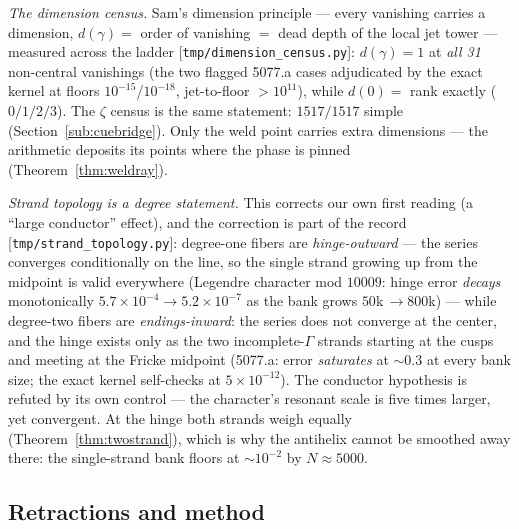 \documentclass[11pt]{article}
\newcommand{\code}[1]{\texttt{#1}}
\begin{document}
\emph{The dimension census.}  Sam's dimension principle --- every vanishing carries a dimension,
$d(\gamma)=$ order of vanishing $=$ dead depth of the local jet tower --- measured across the
ladder [\code{tmp/dimension\_census.py}]: $d(\gamma)=1$ at \emph{all 31} non-central vanishings
(the two flagged 5077.a cases adjudicated by the exact kernel at floors
$10^{-15}$/$10^{-18}$, jet-to-floor $>10^{11}$), while $d(0)=$ rank exactly ($0/1/2/3$).  The
$\zeta$ census is the same statement: $1517/1517$ simple (Section~\ref{sub:cuebridge}).  Only the
weld point carries extra dimensions --- the arithmetic deposits its points where the phase is
pinned (Theorem~\ref{thm:weldray}).

\emph{Strand topology is a degree statement.}  This corrects our own first reading (a ``large
conductor'' effect), and the correction is part of the record [\code{tmp/strand\_topology.py}]:
degree-one fibers are \emph{hinge-outward} --- the series converges conditionally on the line, so
the single strand growing up from the midpoint is valid everywhere (Legendre character mod
$10009$: hinge error \emph{decays} monotonically $5.7\times10^{-4}\to5.2\times10^{-7}$ as the bank
grows $50$k$\,\to800$k) --- while degree-two fibers are \emph{endings-inward}: the series does not
converge at the center, and the hinge exists only as the two incomplete-$\Gamma$ strands starting
at the cusps and meeting at the Fricke midpoint (5077.a: error \emph{saturates} at ${\sim}0.3$ at
every bank size; the exact kernel self-checks at $5\times10^{-12}$).  The conductor hypothesis is
refuted by its own control --- the character's resonant scale is five times larger, yet
convergent.  At the hinge both strands weigh equally (Theorem~\ref{thm:twostrand}), which is why
the antihelix cannot be smoothed away there: the single-strand bank floors at ${\sim}10^{-2}$ by
$N\approx5000$.

\subsection{Retractions and method}\label{sub:retractions}
\end{document}
